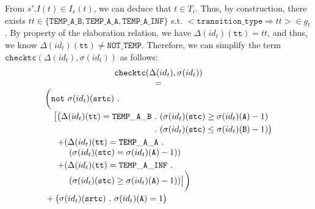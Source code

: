 \documentclass[dvipsnames,12pt]{article}
\begin{document}
\begin{niproof}
\begin{enumerate}
\begin{enumerate}
      From $s'.I(t)\in{}I_s(t)$, we can deduce that $t\in{}T_i$. Thus,
      by construction, there exists
      $tt\in\{\mathtt{TEMP\_A\_B},\mathtt{TEMP\_A\_A},\mathtt{TEMP\_A\_INF}\}$
      s.t. ${<}\mathtt{transition\_type\Rightarrow}tt{>}\in{}g_t$. By
      property of the elaboration relation, we have
      $\Delta(id_t)(\texttt{tt})=tt$, and thus, we know
      $\Delta(id_t)(\texttt{tt})\neq{}\mathtt{NOT\_TEMP}$. Therefore,
      we can simplify the term
      $\mathtt{checktc}(\Delta(id_t),\sigma(id_t))$ as follows:
      \begin{equation}        
        \label{eq:eq-checktc-minus-not-temp}
        \begin{array}{@{}c@{}}
          \mathtt{checktc}(\Delta(id_t),\sigma(id_t)) \\
          = \\
          {\begin{split}
              &\bigg(\mathtt{not}~\sigma(id_t)(\texttt{srtc})~.~\\
              & \quad\begin{split}
                \big[\big(\Delta(id_t)(\texttt{tt})=\mathtt{TEMP\_A\_B}~&.~(\sigma(id_t)(\texttt{stc})\ge{}\sigma(id_t)(\texttt{A})-1)~\\
                &.~(\sigma(id_t)(\texttt{stc})\le{}\sigma(id_t)(\texttt{B})-1)\big)\\
              \end{split} \\
              & \quad{\begin{array}{l}
                        +(\Delta(id_t)(\texttt{tt})=\mathtt{TEMP\_A\_A}~.\\
                        \quad~(\sigma(id_t)(\texttt{stc})={}\sigma(id_t)(\texttt{A})-1)) \\
                      \end{array}}\\
                    &
                    \quad{\begin{array}{l}
                            +(\Delta(id_t)(\texttt{tt})=\mathtt{TEMP\_A\_INF}~. \\
                            \quad~(\sigma(id_t)(\texttt{stc})\ge{}\sigma(id_t)(\texttt{A})-1))\big]\bigg) \\
                          \end{array}}\\
                        & +\big(\sigma(id_t)(\texttt{srtc})~.~\sigma(id_t)(\texttt{A})=1\big)\\
                      \end{split}} \\
        \end{array}
      \end{equation}
      

\end{enumerate}
\end{enumerate}
\end{niproof}
\end{document}
